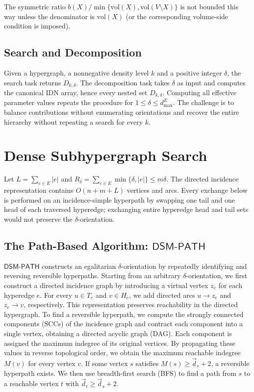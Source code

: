 \documentclass[twocolumn]{svjour3}
\newcommand{\kw}[1]{{\ensuremath{\mathsf{#1}}}\xspace}
\begin{document}
The symmetric ratio $b(X)/\min\{\mathrm{vol}(X),\mathrm{vol}(V\setminus X)\}$ is not bounded this way unless the denominator is $\mathrm{vol}(X)$ (or the corresponding volume-side condition is imposed).


\subsection{Search and Decomposition}
Given a hypergraph, a nonnegative density level $k$ and a positive integer $\delta$, the search task returns $D_{k,\delta}$. The decomposition task takes $\delta$ as input and computes the canonical IDN array, hence every nested set $D_{k,\delta}$. Computing all effective parameter values repeats the procedure for $1\le\delta\le d^E_{\max}$. The challenge is to balance contributions without enumerating orientations and recover the entire hierarchy without repeating a search for every $k$.

\section{Dense Subhypergraph Search}
\label{sec:search}
Let $L=\sum_{e\in E}|e|$ and $R_\delta=\sum_{e\in E}\min\{\delta,|e|\}\le m\delta$. The directed incidence representation contains $O(n+m+L)$ vertices and arcs. Every exchange below is performed on an incidence-simple hyperpath by swapping one tail and one head of each traversed hyperedge; exchanging entire hyperedge head and tail sets would not preserve the $\delta$-orientation.

\subsection{The Path-Based Algorithm: $\kw{DSM\text{-}PATH}$}
\kw{DSM\text{-}PATH} constructs an egalitarian $\delta$-orientation by repeatedly identifying and reversing reversible hyperpaths. Starting from an arbitrary $\delta$-orientation, we first construct a directed incidence graph by introducing a virtual vertex $z_e$ for each hyperedge $e$. For every $u\in T_e$ and $v\in H_e$, we add directed arcs $u\rightarrow z_e$ and $z_e\rightarrow v$, respectively. This representation preserves reachability in the directed hypergraph.
To find a reversible hyperpath, we compute the strongly connected components (SCCs) of the incidence graph and contract each component into a single vertex, obtaining a directed acyclic graph (DAG). Each component is assigned the maximum indegree of its original vertices. By propagating these values in reverse topological order, we obtain the maximum reachable indegree $M(v)$ for every vertex $v$. If some vertex $s$ satisfies $M(s)\ge\vec d_s+2$, a reversible hyperpath exists. We then use breadth-first search (BFS) to find a path from $s$ to a reachable vertex $t$ with $\vec d_t\ge\vec d_s+2$.
\end{document}
